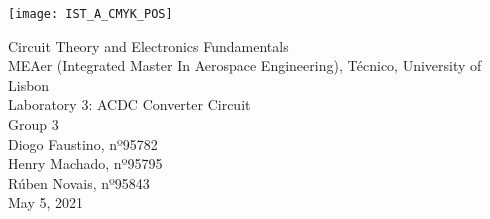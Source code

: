 
\thispagestyle {empty}

\texttt{[image: IST\_A\_CMYK\_POS]}

\begin{center}
%
\vspace{1.0cm}

\vspace{1cm}
{\FontLb Circuit Theory and Electronics Fundamentals} \\ %
\vspace{1cm}
{\FontSn MEAer (Integrated Master In Aerospace Engineering), Técnico, University of Lisbon} \\ %
\vspace{1cm}
{\FontSn Laboratory 3: ACDC Converter Circuit} \\
\vspace{1cm}
{\FontSn Group 3} \\
\vspace{0.7cm}
{\FontSn Diogo Faustino, nº95782} \\
\vspace{0.4mm}
{\FontSn Henry Machado, nº95795} \\
\vspace{0.4mm}
{\FontSn Rúben Novais, nº95843} \\
\vspace{1cm}
{\FontSn May 5, 2021} \\ %
%
\end{center}

